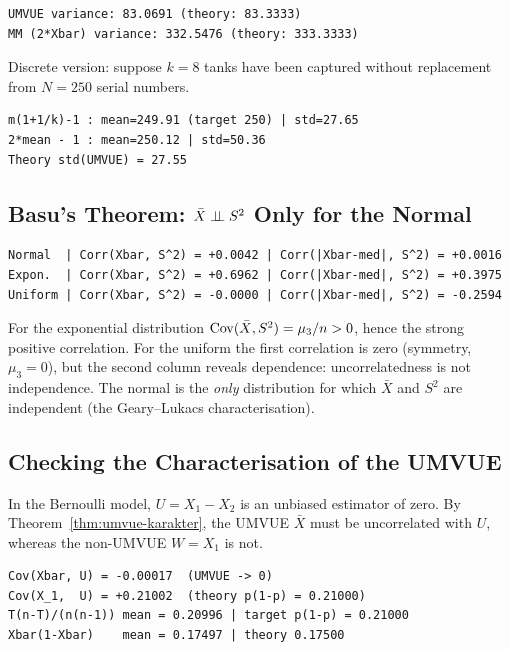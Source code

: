 \documentclass[main.tex]{subfiles}
\begin{document}
\begin{lstlisting}[style=output]
UMVUE variance: 83.0691 (theory: 83.3333)
MM (2*Xbar) variance: 332.5476 (theory: 333.3333)
\end{lstlisting}

Discrete version: suppose $k=8$ tanks have been captured without replacement from $N=250$ serial numbers.

\begin{lstlisting}[style=output]
m(1+1/k)-1 : mean=249.91 (target 250) | std=27.65
2*mean - 1 : mean=250.12 | std=50.36
Theory std(UMVUE) = 27.55
\end{lstlisting}

\subsection{Basu's Theorem: $\bar X\perp\!\!\!\perp S^2$ Only for the Normal}

\begin{lstlisting}[style=output]
Normal  | Corr(Xbar, S^2) = +0.0042 | Corr(|Xbar-med|, S^2) = +0.0016
Expon.  | Corr(Xbar, S^2) = +0.6962 | Corr(|Xbar-med|, S^2) = +0.3975
Uniform | Corr(Xbar, S^2) = -0.0000 | Corr(|Xbar-med|, S^2) = -0.2594
\end{lstlisting}

For the exponential distribution $\operatorname{Cov}(\bar X,S^2)=\mu_3/n>0$, hence the strong positive correlation. For the uniform the first correlation is zero (symmetry, $\mu_3=0$), but the second column reveals dependence: uncorrelatedness is not independence. The normal is the \emph{only} distribution for which $\bar X$ and $S^2$ are independent (the Geary--Lukacs characterisation).

\subsection{Checking the Characterisation of the UMVUE}
In the Bernoulli model, $U=X_1-X_2$ is an unbiased estimator of zero. By Theorem~\ref{thm:umvue-karakter}, the UMVUE $\bar X$ must be uncorrelated with $U$, whereas the non-UMVUE $W=X_1$ is not.

\begin{lstlisting}[style=output]
Cov(Xbar, U) = -0.00017  (UMVUE -> 0)
Cov(X_1,  U) = +0.21002  (theory p(1-p) = 0.21000)
T(n-T)/(n(n-1)) mean = 0.20996 | target p(1-p) = 0.21000
Xbar(1-Xbar)    mean = 0.17497 | theory 0.17500
\end{lstlisting}
\end{document}
